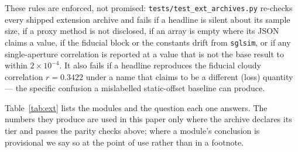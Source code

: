 \documentclass[twocolumn,10pt]{article}
\begin{document}
These rules are enforced, not promised: {\tt tests/test\_ext\_archives.py}
re-checks every shipped extension archive and fails if a headline is silent about
its sample size, if a proxy method is not disclosed, if an array is empty where
its JSON claims a value, if the fiducial block or the constants drift from
{\tt sglsim}, or if any single-aperture correlation is reported at a value that
is not the base result to within $2\times10^{-4}$. It also fails if a headline
reproduces the fiducial cloudy correlation $r=0.3422$ under a name that claims
to be a different (loss) quantity --- the specific confusion a mislabelled
static-offset baseline can produce.

Table~\ref{tab:ext} lists the modules and the question each one answers. The
numbers they produce are used in this paper only where the archive declares its
tier and passes the parity checks above; where a module's conclusion is
provisional we say so at the point of use rather than in a footnote.
\end{document}
